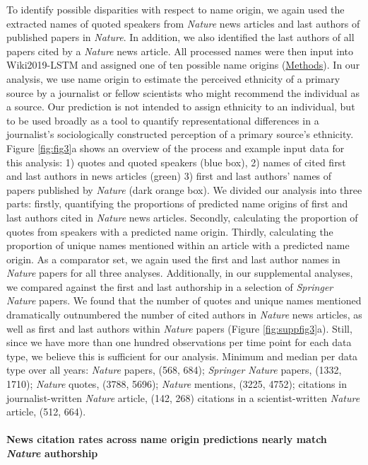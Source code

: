 To identify possible disparities with respect to name origin, we again used the extracted names of quoted speakers from \emph{Nature} news articles and last authors of published papers in \emph{Nature}.
In addition, we also identified the last authors of all papers cited by a \emph{Nature} news article.
All processed names were then input into Wiki2019-LSTM and assigned one of ten possible name origins (\protect\hyperlink{methods}{Methods}).
In our analysis, we use name origin to estimate the perceived ethnicity of a primary source by a journalist or fellow scientists who might recommend the individual as a source.
Our prediction is not intended to assign ethnicity to an individual, but to be used broadly as a tool to quantify representational differences in a journalist's sociologically constructed perception of a primary source's ethnicity.
Figure \ref{fig:fig3}a shows an overview of the process and example input data for this analysis: 1) quotes and quoted speakers (blue box), 2) names of cited first and last authors in news articles (green) 3) first and last authors' names of papers published by \emph{Nature} (dark orange box).
We divided our analysis into three parts: firstly, quantifying the proportions of predicted name origins of first and last authors cited in \emph{Nature} news articles.
Secondly, calculating the proportion of quotes from speakers with a predicted name origin.
Thirdly, calculating the proportion of unique names mentioned within an article with a predicted name origin.
As a comparator set, we again used the first and last author names in \emph{Nature} papers for all three analyses.
Additionally, in our supplemental analyses, we compared against the first and last authorship in a selection of \emph{Springer Nature} papers.
We found that the number of quotes and unique names mentioned dramatically outnumbered the number of cited authors in \emph{Nature} news articles, as well as first and last authors within \emph{Nature} papers (Figure \ref{fig:suppfig3}a).
Still, since we have more than one hundred observations per time point for each data type, we believe this is sufficient for our analysis.
Minimum and median per data type over all years: \emph{Nature} papers, (568, 684); \emph{Springer Nature} papers, (1332, 1710); \emph{Nature} quotes, (3788, 5696); \emph{Nature} mentions, (3225, 4752); citations in journalist-written \emph{Nature} article, (142, 268) citations in a scientist-written \emph{Nature} article, (512, 664).

\hypertarget{news-citation-rates-across-name-origin-predictions-nearly-match-nature-authorship}{%
\paragraph{\texorpdfstring{News citation rates across name origin predictions nearly match \emph{Nature} authorship}{News citation rates across name origin predictions nearly match Nature authorship}}\label{news-citation-rates-across-name-origin-predictions-nearly-match-nature-authorship}}

